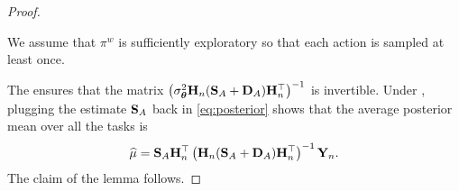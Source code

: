 \begin{proof}
\begin{assumption}
\label{assm:exploration}
    We assume that $\pi^w$ is sufficiently exploratory so that each action is sampled at least once. 
\end{assumption}
The  ensures that the matrix $\left(\sigma^2_{\boldsymbol{\theta}}\mathbf{H}_n(\mathbf{S}_A + \mathbf{D}_A)\mathbf{H}_n^\top\right)^{-1}$ is invertible.
%
Under , plugging the estimate $\mathbf{S}_A$ back in \eqref{eq:posterior} shows that the average posterior mean over all the tasks is
\begin{align}
    \widehat{\mu} = \mathbf{S}_A\mathbf{H}_n^\top\left(\mathbf{H}_n(\mathbf{S}_A + \mathbf{D}_A)\mathbf{H}_n^\top\right)^{-1}\mathbf{Y}_n.
\end{align}
%
%
%
%
%
%
%
The claim of the lemma follows.
\end{proof}




